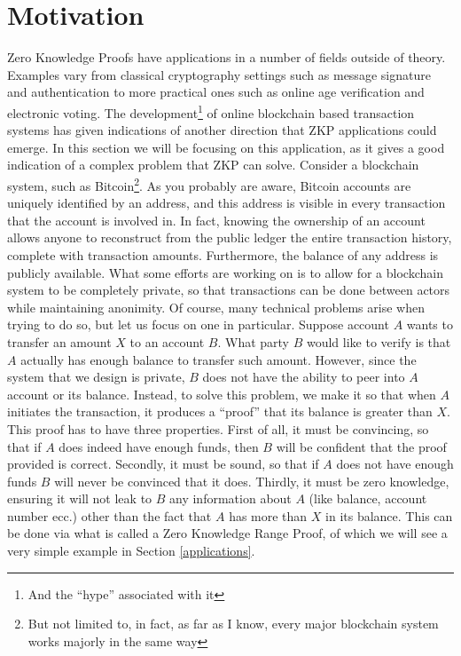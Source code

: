 \documentclass{article}
\begin{document}
\section{Motivation}
\label{motivation}
Zero Knowledge Proofs have applications in a number of fields outside of theory.
Examples vary from classical cryptography settings such as message signature and authentication to more
practical ones such as online age verification and electronic voting. The development\footnote{And the \enquote{hype} associated with it}
of online blockchain based transaction systems has given indications of another direction that ZKP applications could
emerge. In this section we will be focusing on this application, as it gives a good indication of a complex problem that
ZKP can solve. Consider a blockchain system, such as Bitcoin\footnote{But not limited to, in fact, as far as I know, every major blockchain system works majorly in the same way}.
As you probably are aware, Bitcoin accounts are uniquely identified
by an address, and this address is visible in every transaction that the account is involved in. In fact, knowing the ownership
of an account allows anyone to reconstruct from the public ledger the entire transaction history, complete with transaction
amounts. Furthermore, the balance of any address is publicly available. What some efforts are working on is to allow
for a blockchain system to be completely private, so that transactions can be done between actors while maintaining
anonimity. Of course, many technical problems arise when trying to do so, but let us focus on one in particular.
Suppose account $A$ wants to transfer an amount $X$ to an account $B$. What party $B$ would like to verify is that
$A$ actually has enough balance to transfer such amount. However, since the system that we design is private, $B$ does
not have the ability to peer into $A$ account or its balance. Instead, to solve this problem, we make it so that
when $A$ initiates the transaction, it produces a \enquote{proof} that its balance is greater than $X$.
This proof has to have three properties. First of all, it must be convincing, so that if $A$ does indeed have
enough funds, then $B$ will be confident that the proof provided is correct. Secondly, it must be
sound, so that if $A$ does not have enough funds $B$ will never be convinced that it does. Thirdly, it must
be zero knowledge, ensuring it will not leak to $B$ any information about $A$ (like balance, account number ecc.) other
than the fact that $A$ has more than $X$ in its balance. This can be done via what is called a Zero Knowledge Range Proof,
of which we will see a very simple example in Section \ref{applications}.
\end{document}
